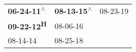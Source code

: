 \begin{supertabular}{lll}
 \textbf{06-24-11\textsuperscript{$\wedge$}} &  \textbf{08-13-15\textsuperscript{$\wedge$}} &  08-23-19\textsuperscript{} \\
        \textbf{09-22-12\textsuperscript{H}} &                   08-06-16\textsuperscript{} &                             \\
                  08-14-14\textsuperscript{} &                   08-25-18\textsuperscript{} &                             \\
\end{supertabular}
